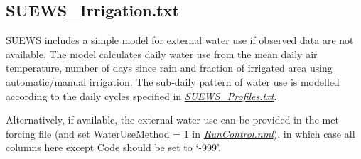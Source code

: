 \documentclass[letterpaper,10pt,english]{sphinxmanual}
\begin{document}
\subsection{SUEWS\_Irrigation.txt}
\label{\detokenize{input_files/SUEWS_SiteInfo/SUEWS_Irrigation:suews-irrigation-txt}}\label{\detokenize{input_files/SUEWS_SiteInfo/SUEWS_Irrigation::doc}}
SUEWS includes a simple model for external water use if observed data
are not available. The model calculates daily water use from the mean
daily air temperature, number of days since rain and fraction of
irrigated area using automatic/manual irrigation. The sub-daily pattern
of water use is modelled according to the daily cycles specified in
{\hyperref[\detokenize{input_files/SUEWS_SiteInfo/SUEWS_Irrigation:SUEWS_Profiles.txt}]{\emph{SUEWS\_Profiles.txt}}}.

Alternatively, if available, the external water use can be provided in
the met forcing file (and set WaterUseMethod = 1 in
{\hyperref[\detokenize{input_files/SUEWS_SiteInfo/SUEWS_Irrigation:RunControl.nml}]{\emph{RunControl.nml}}}), in which case all columns here
except Code should be set to ‘-999’.
\end{document}
